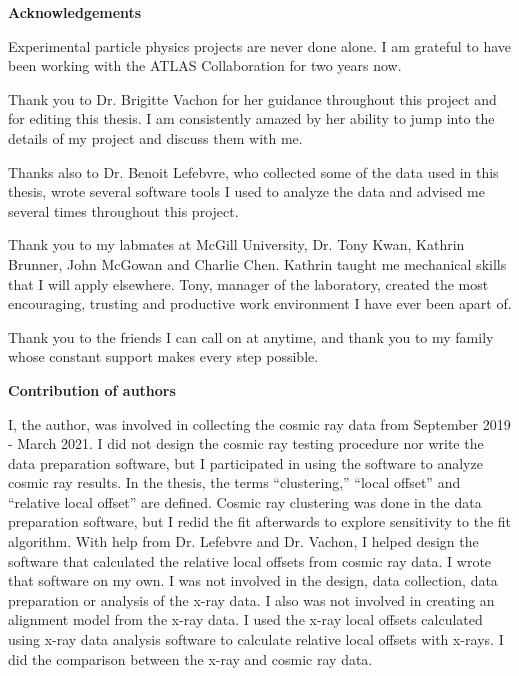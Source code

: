 \begin{center}\textbf{Acknowledgements}\end{center}

Experimental particle physics projects are never done alone. I am grateful to have been working with the ATLAS Collaboration for two years now.

Thank you to Dr. Brigitte Vachon for her guidance throughout this project and for editing this thesis. I am consistently amazed by her ability to jump into the details of my project and discuss them with me. 

Thanks also to Dr. Benoit Lefebvre, who collected some of the data used in this thesis, wrote several software tools I used to analyze the data and advised me several times throughout this project. 

Thank you to my labmates at McGill University, Dr. Tony Kwan, Kathrin Brunner, John McGowan and Charlie Chen. Kathrin taught me mechanical skills that I will apply elsewhere. Tony, manager of the laboratory, created the most encouraging, trusting and productive work environment I have ever been apart of.

Thank you to the friends I can call on at anytime, and thank you to my family whose constant support makes every step possible.

\cleardoublepage

 \begin{center}\textbf{Contribution of authors}\end{center}
  
 \noindent

I, the author, was involved in collecting the cosmic ray data from September 2019 - March 2021. I did not design the cosmic ray testing procedure nor write the data preparation software, but I participated in using the software to analyze cosmic ray results. In the thesis, the terms ``clustering,'' ``local offset'' and ``relative local offset'' are defined. Cosmic ray clustering was done in the data preparation software, but I redid the fit afterwards to explore sensitivity to the fit algorithm. With help from Dr. Lefebvre and Dr. Vachon, I helped design the software that calculated the relative local offsets from cosmic ray data. I wrote that software on my own. I was not involved in the design, data collection, data preparation or analysis of the x-ray data. I also was not involved in creating an alignment model from the x-ray data. I used the x-ray local offsets calculated using x-ray data analysis software to calculate relative local offsets with x-rays. I did the comparison between the x-ray and cosmic ray data.

